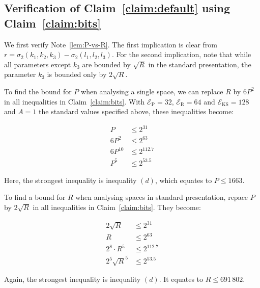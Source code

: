 \documentclass{article}
\newcommand{\expP}{\mathcal E_{\text{P}}}
\newcommand{\expR}{\mathcal E_{\text{R}}}
\newcommand{\expKS}{\mathcal E_{\text{KS}}}
\begin{document}
\subsection*{Verification of Claim~\ref{claim:default} using Claim~\ref{claim:bits}}

We first verify Note~\ref{lem:P-vs-R}.
The first implication is clear from \(r = \sigma_2(k_1,k_2,k_3) - \sigma_2(l_1,l_2,l_3)\).
For the second implication, note that while all parameters except \(k_3\) are bounded by \(\sqrt{R}\) in the standard presentation, the parameter \(k_3\) is bounded only by \(2\sqrt{R}\).

To find the bound for \(P\) when analysing a single space, we can replace \(R\) by \(6P^2\) in all inequalities in Claim~\ref{claim:bits}. With \(\expP=32\), \(\expR=64\) and \(\expKS=128\) and \(A=1\) the standard values specified above, these inequalities become:
\begin{multicols}{2}
  \noindent\allowdisplaybreaks
  \begin{align*}
    P & \leq 2^{31}  \label{eq:bits:PeP}\tag{$a$}     \\
    6P^2 & \leq 2^{63}  \label{eq:bits:ReR}\tag{$b$}        \\
    6P^{10} & \leq 2^{112.7} \label{eq:bits:RPeKS} \tag{$c$} \\
    P^5  & \leq 2^{53.5}\label{eq:bits:PsKS} \tag{$d$}
  \end{align*}
\end{multicols}
Here, the strongest inequality is inequality \((d)\), which equates to \(P\leq 1663\).

To find a bound for \(R\) when analysing spaces in standard presentation, repace \(P\) by \(2\sqrt{R}\) in all inequalities in Claim~\ref{claim:bits}.  They become:
\begin{multicols}{2}
  \noindent\allowdisplaybreaks
  \begin{align*}
    2\sqrt{R} & \leq 2^{31}  \label{eq:bits:PeP}\tag{$a$}     \\
    R    & \leq 2^{63}  \label{eq:bits:ReR}\tag{$a'$}        \\
    2^8·R^5  & \leq 2^{112.7} \label{eq:bits:PeKS} \tag{$b$}  \\
    2^5\sqrt{R}^5  & \leq 2^{53.5}\label{eq:bits:PsKS} \tag{$d$}
  \end{align*}
\end{multicols}
Again, the strongest inequality is inequality \((d)\).  It equates to \(R\leq 691\,802\).
\end{document}
